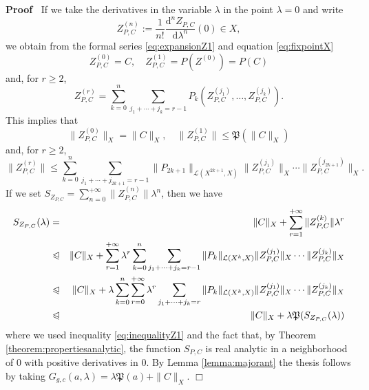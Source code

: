 \documentclass{article}
\newcommand{\assign}{:=}
\newcommand{\mathd}{\mathrm{d}}
\newenvironment{proof}{\noindent\textbf{Proof\ }}{\hspace*{\fill}$\Box$\medskip}
\begin{document}
\begin{proof}
  If we take the derivatives in the variable $\lambda$ in the point $\lambda =
  0$ and write
  \[ Z_{P, C}^{(n)} \assign \frac{1}{n!} \frac{\mathd^n Z_{P, C}}{\mathd
     \lambda^n} (0) \in X, \]
  we obtain from the formal series {\eqref{eq:expansionZ1}} and equation
  {\eqref{eq:fixpointX}}
  \[ Z^{(0)}_{P, C} = C, \quad Z^{(1)}_{P, C} = P (Z^{(0)}) = P (C) \]
  and, for $r \geqslant 2$,
  \[ Z^{(r)}_{P, C} = \sum_{k = 0}^n \sum_{j_1 + \cdots + j_k = r - 1} P_k
     (Z^{(j_1)}_{P, C}, \ldots, Z^{(j_k)}_{P, C}) . \]
  This implies that
  \[ \| Z^{(0)}_{P, C} \|_X = \| C \|_X, \quad \| Z^{(1)}_{P, C} \| \leqslant
     \mathfrak{P} (\| C \|_X) \]
  and, for $r \geqslant 2$,
  \begin{equation}
    \| Z^{(r)}_{P, C} \| \leqslant \sum_{k = 0}^n \sum_{j_1 + \cdots + j_{2 k
    + 1} = r - 1} \| P_{2 k + 1} \|_{\mathcal{L} (X^{2 k + 1}, X)} \|
    Z^{(j_1)}_{P, C} \|_X \cdots \| Z^{(j_{2 k + 1})}_{P, C} \|_X .
    \label{eq:inequalityZ1}
  \end{equation}
  \[ \  \]
  If we set $S_{Z_{P, C}} = \sum_{n = 0}^{+ \infty} \| Z^{(n)}_{P, C} \|
  \lambda^n$, then we have
  \begin{eqnarray}
    S_{Z_{P, C}} (\lambda) & = & \| C \|_X + \sum_{r = 1}^{+ \infty} \|
    Z^{(k)}_{P, C} \| \lambda^r \nonumber\\
    & \trianglelefteqslant & \| C \|_X + \sum_{r = 1}^{+ \infty} \lambda^r
    \sum_{k = 0}^n \sum_{j_1 + \cdots + j_k = r - 1} \| P_k \|_{\mathcal{L}
    (X^k, X)} \| Z^{(j_1)}_{P, C} \|_X \cdots \| Z^{(j_k)}_{P, C} \|_X
    \nonumber\\
    & \trianglelefteqslant & \| C \|_X + \lambda \sum_{k = 0}^n \sum_{r =
    0}^{+ \infty} \lambda^r \sum_{j_1 + \cdots + j_k = r} \| P_k
    \|_{\mathcal{L} (X^k, X)} \| Z^{(j_1)}_{P, C} \|_X \cdots \| Z^{(j_k)}_{P,
    C} \|_X \nonumber\\
    & \trianglelefteqslant & \| C \|_X + \lambda \mathfrak{P} (S_{Z_{P, C}}
    (\lambda)) \nonumber
  \end{eqnarray}
  where we used inequality {\eqref{eq:inequalityZ1}} and the fact that, by
  Theorem \ref{theorem:propertiesanalytic}, the function $S_{P, C}$ is real
  analytic in a neighborhood of $0$ with positive derivatives in $0$. By Lemma
  \ref{lemma:majorant} the thesis follows by taking $G_{g, c} (a, \lambda) =
  \lambda \mathfrak{P} (a) + \| C \|_X$.
\end{proof}
\end{document}
